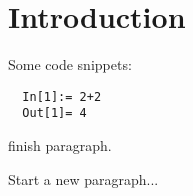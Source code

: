 \section{Introduction}

Some code snippets:
\begin{lstlisting}
  In[1]:= 2+2
  Out[1]= 4
\end{lstlisting}
finish paragraph.

Start a new paragraph...
